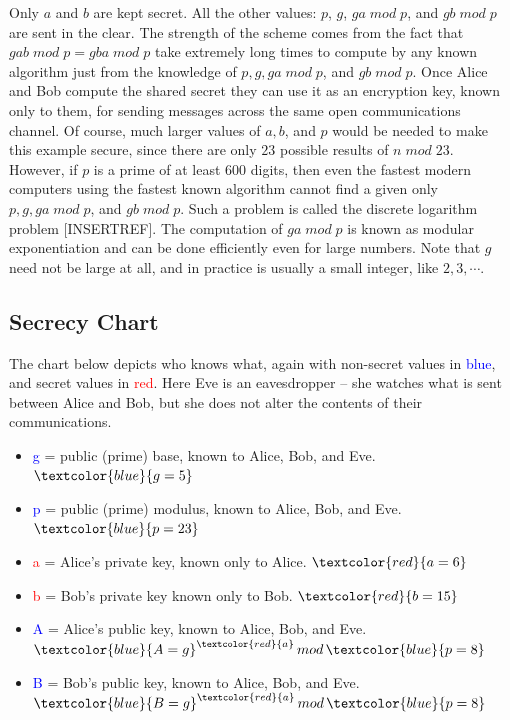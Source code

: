 Only $a$ and $b$ are kept secret.
All the other values: $p$, $g$, $ga \; mod \; p$, and $gb\; mod \; p$ are sent in the clear.
The strength of the scheme comes from the fact that $gab \; mod \; p = gba \; mod \; p$ take extremely long times to compute by any
known algorithm just from the knowledge of $p, g, ga \; mod \; p$, and $gb \; mod \; p$.
Once Alice and Bob compute the shared secret they can use it as an encryption key, known only to them, for sending
messages across the same open communications channel.
Of course, much larger values of $a, b$, and $p$ would be needed to make this example secure, since there are only $23$ possible
results of $n \; mod \; 23$.
However, if $p$ is a prime of at least 600 digits, then even the fastest modern computers using the fastest known algorithm
cannot find a given only $p, g, ga \; mod \; p$, and $gb \; mod \; p$.
Such a problem is called the discrete logarithm problem [INSERTREF].
The computation of $ga \; mod \; p$ is known as modular exponentiation and can be done efficiently even for large numbers.
Note that $g$ need not be large at all, and in practice is usually a small integer, like $2, 3, \cdots$.

\subsection{Secrecy Chart}\label{subsec:secrecy-chart}
The chart below depicts who knows what, again with non-secret values in \textcolor{blue}{blue}, and secret values in \textcolor{red}{red}.
Here Eve is an eavesdropper – she watches what is sent between Alice and Bob, but she does not alter the contents of their communications.
\begin{itemize}
    \item \textcolor{blue}{g} = public (prime) base, known to Alice, Bob, and Eve. $\textcolor{blue}{g = 5}$
    \item \textcolor{blue}{p} = public (prime) modulus, known to Alice, Bob, and Eve. $\textcolor{blue}{p = 23}$
    \item \textcolor{red}{a} = Alice's private key, known only to Alice. $\textcolor{red}{a = 6}$
    \item \textcolor{red}{b} = Bob's private key known only to Bob. $\textcolor{red}{b = 15}$
    \item \textcolor{blue}{A} = Alice's public key, known to Alice, Bob, and Eve. $\textcolor{blue}{A = g}^{\textcolor{red}{a}} \, mod \, \textcolor{blue}{p = 8}$
    \item \textcolor{blue}{B} = Bob's public key, known to Alice, Bob, and Eve. $\textcolor{blue}{B = g}^{\textcolor{red}{a}} \, mod \, \textcolor{blue}{p = 8}$
\end{itemize}

